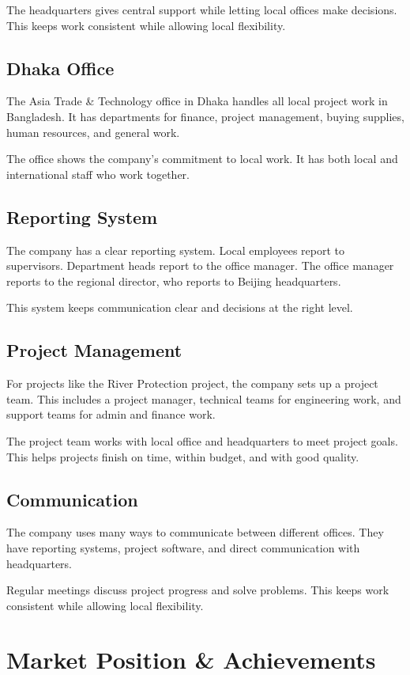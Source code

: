 The headquarters gives central support while letting local offices make decisions. This keeps work consistent while allowing local flexibility.

\subsection{Dhaka Office}
The Asia Trade \& Technology office in Dhaka handles all local project work in Bangladesh. It has departments for finance, project management, buying supplies, human resources, and general work.

The office shows the company's commitment to local work. It has both local and international staff who work together.

\subsection{Reporting System}
The company has a clear reporting system. Local employees report to supervisors. Department heads report to the office manager. The office manager reports to the regional director, who reports to Beijing headquarters.

This system keeps communication clear and decisions at the right level.

\subsection{Project Management}
For projects like the River Protection project, the company sets up a project team. This includes a project manager, technical teams for engineering work, and support teams for admin and finance work.

The project team works with local office and headquarters to meet project goals. This helps projects finish on time, within budget, and with good quality.

\subsection{Communication}
The company uses many ways to communicate between different offices. They have reporting systems, project software, and direct communication with headquarters.

Regular meetings discuss project progress and solve problems. This keeps work consistent while allowing local flexibility.

\section{Market Position \& Achievements}

